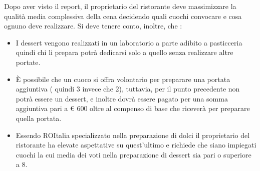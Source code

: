 \documentclass[../modello-progetto.tex]{subfiles}
\begin{document}
Dopo aver visto il report, il proprietario del ristorante deve massimizzare la qualità media complessiva della cena decidendo quali cuochi convocare e cosa ognuno deve realizzare.
Si deve tenere conto, inoltre, che :
\begin{itemize}
	\item I dessert vengono realizzati in un laboratorio a parte adibito a pasticceria quindi chi li prepara potrà dedicarsi solo a quello senza realizzare altre portate.
	\item È possibile che un cuoco si offra volontario per preparare una portata aggiuntiva ( quindi 3 invece che 2), tuttavia, per il punto precedente non potrà essere un dessert, e inoltre dovrà essere pagato per una somma aggiuntiva pari a € 600 oltre al compenso di base che riceverà per preparare quella portata.
	\item Essendo ROItalia specializzato nella preparazione di dolci il proprietario del ristorante ha elevate aspettative su quest'ultimo e richiede che siano impiegati cuochi la cui media dei voti nella preparazione di dessert sia pari o superiore a 8.
\end{itemize}
\end{document}
